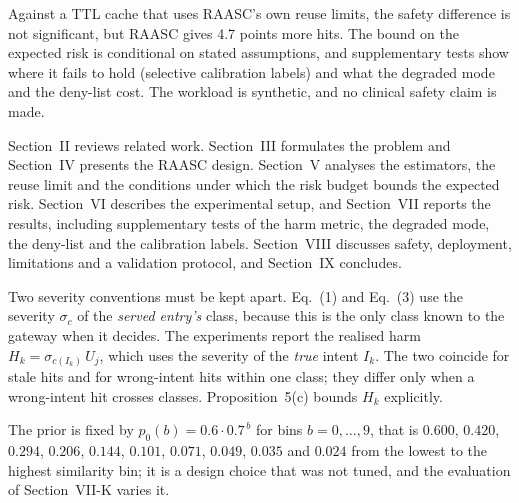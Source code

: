 
Against a TTL cache that uses RAASC's own reuse limits, the safety difference is not significant, but RAASC gives 4.7 points more hits. The bound on the expected risk is conditional on stated assumptions, and supplementary tests show where it fails to hold (selective calibration labels) and what the degraded mode and the deny-list cost. The workload is synthetic, and no clinical safety claim is made.

Section~II reviews related work. Section~III formulates the problem and Section~IV presents the RAASC design. Section~V analyses the estimators, the reuse limit and the conditions under which the risk budget bounds the expected risk. Section~VI describes the experimental setup, and Section~VII reports the results, including supplementary tests of the harm metric, the degraded mode, the deny-list and the calibration labels. Section~VIII discusses safety, deployment, limitations and a validation protocol, and Section~IX concludes.

Two severity conventions must be kept apart. Eq.~(1) and Eq.~(3) use the severity $\sigma_c$ of the \emph{served entry's} class, because this is the only class known to the gateway when it decides. The experiments report the realised harm $H_k=\sigma_{c(I_k)}\,U_j$, which uses the severity of the \emph{true} intent $I_k$. The two coincide for stale hits and for wrong-intent hits within one class; they differ only when a wrong-intent hit crosses classes. Proposition~5(c) bounds $H_k$ explicitly.

The prior is fixed by $p_0(b)=0.6\cdot 0.7^{\,b}$ for bins $b=0,\dots,9$, that is $0.600$, $0.420$, $0.294$, $0.206$, $0.144$, $0.101$, $0.071$, $0.049$, $0.035$ and $0.024$ from the lowest to the highest similarity bin; it is a design choice that was not tuned, and the evaluation of Section~VII-K varies it.

